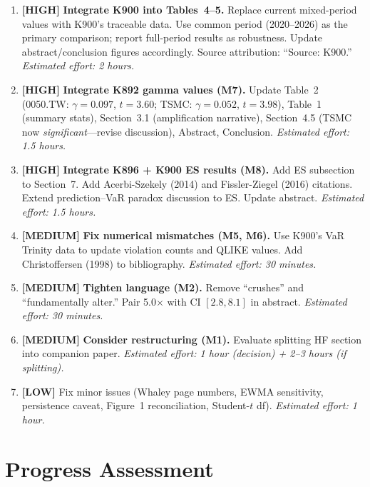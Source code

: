 \documentclass[12pt,a4paper]{article}
\begin{document}
\begin{enumerate}

\item \textbf{[HIGH]} \textbf{Integrate K900 into Tables~4--5.} Replace current mixed-period values with K900's traceable data. Use common period (2020--2026) as the primary comparison; report full-period results as robustness. Update abstract/conclusion figures accordingly. Source attribution: ``Source: K900.'' \textit{Estimated effort: 2 hours.}

\item \textbf{[HIGH]} \textbf{Integrate K892 gamma values (M7).} Update Table~2 (0050.TW: $\gamma = 0.097$, $t = 3.60$; TSMC: $\gamma = 0.052$, $t = 3.98$), Table~1 (summary stats), Section~3.1 (amplification narrative), Section~4.5 (TSMC now \textit{significant}---revise discussion), Abstract, Conclusion. \textit{Estimated effort: 1.5 hours.}

\item \textbf{[HIGH]} \textbf{Integrate K896 + K900 ES results (M8).} Add ES subsection to Section~7. Add Acerbi-Szekely (2014) and Fissler-Ziegel (2016) citations. Extend prediction--VaR paradox discussion to ES. Update abstract. \textit{Estimated effort: 1.5 hours.}

\item \textbf{[MEDIUM]} \textbf{Fix numerical mismatches (M5, M6).} Use K900's VaR Trinity data to update violation counts and QLIKE values. Add Christoffersen (1998) to bibliography. \textit{Estimated effort: 30 minutes.}

\item \textbf{[MEDIUM]} \textbf{Tighten language (M2).} Remove ``crushes'' and ``fundamentally alter.'' Pair 5.0$\times$ with CI $[2.8, 8.1]$ in abstract. \textit{Estimated effort: 30 minutes.}

\item \textbf{[MEDIUM]} \textbf{Consider restructuring (M1).} Evaluate splitting HF section into companion paper. \textit{Estimated effort: 1 hour (decision) + 2--3 hours (if splitting).}

\item \textbf{[LOW]} Fix minor issues (Whaley page numbers, EWMA sensitivity, persistence caveat, Figure~1 reconciliation, Student-$t$ df). \textit{Estimated effort: 1 hour.}

\end{enumerate}


\section*{Progress Assessment}
\end{document}
